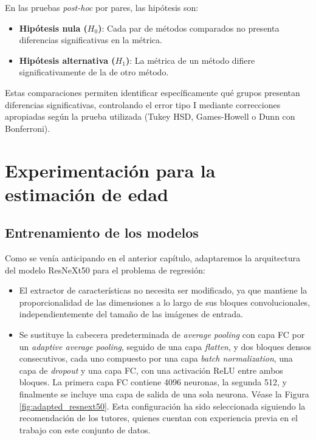 En las pruebas \textit{post-hoc} por pares, las hipótesis son:

\begin{itemize}
    \item \textbf{Hipótesis nula ($H_0$)}: Cada par de métodos comparados no presenta diferencias significativas en la métrica.
    \item \textbf{Hipótesis alternativa ($H_1$)}: La métrica de un método difiere significativamente de la de otro método.
\end{itemize}

Estas comparaciones permiten identificar específicamente qué grupos presentan diferencias significativas, controlando el error tipo I mediante correcciones apropiadas según la prueba utilizada (Tukey HSD, Games-Howell o Dunn con Bonferroni).


\section{Experimentación para la estimación de edad}


\subsection{Entrenamiento de los modelos}

Como se venía anticipando en el anterior capítulo, adaptaremos la arquitectura del modelo ResNeXt50 para el problema de regresión:

\begin{itemize}
    \item El extractor de características no necesita ser modificado, ya que mantiene la proporcionalidad de las dimensiones a lo largo de sus bloques convolucionales, independientemente del tamaño de las imágenes de entrada.
    \item Se sustituye la cabecera predeterminada de \textit{average pooling} con capa \acrshort{FC} por un \textit{adaptive average pooling}, seguido de una capa \textit{flatten}, y dos bloques densos consecutivos, cada uno compuesto por una capa \textit{batch normalization}, una capa de \textit{dropout} y una capa \acrshort{FC}, con una activación ReLU entre ambos bloques. La primera capa \acrshort{FC} contiene 4096 neuronas, la segunda 512, y finalmente se incluye una capa de salida de una sola neurona. Véase la Figura \ref{fig:adapted_resnext50}. Esta configuración ha sido seleccionada siguiendo la recomendación de los tutores, quienes cuentan con experiencia previa en el trabajo con este conjunto de datos.
\end{itemize}


